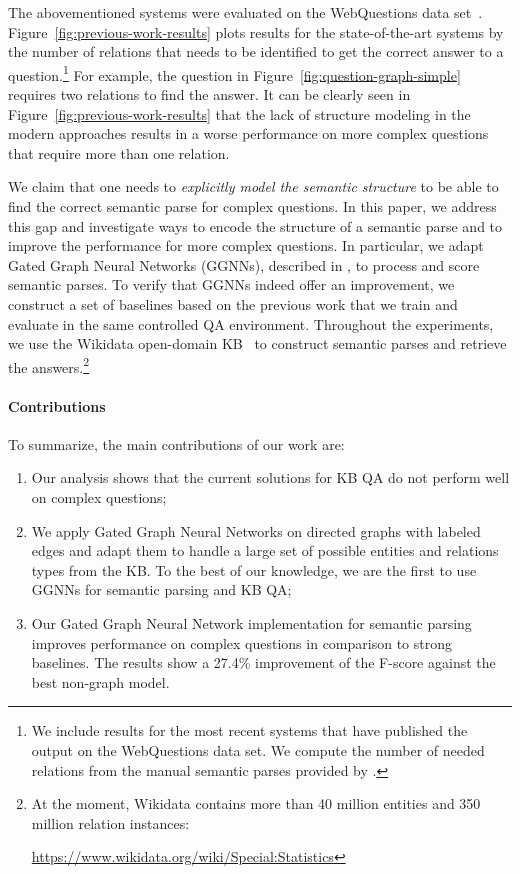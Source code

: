 \documentclass[11pt]{article}
\begin{document}
The abovementioned systems were evaluated on the WebQuestions data set~\cite{Berant2013}. Figure~\ref{fig:previous-work-results} plots results for the state-of-the-art systems by the number of relations that needs to be identified to get the correct answer to a question.\footnote{We include results for the most recent systems that have published the output on the WebQuestions data set. We compute the number of needed relations from the manual semantic parses provided by .} For example, the question in Figure~\ref{fig:question-graph-simple} requires two relations to find the answer. It can be clearly seen in Figure~\ref{fig:previous-work-results} that the lack of structure modeling in the modern approaches results in a worse performance on more complex questions that require more than one relation.

We claim that one needs to \textit{explicitly model the semantic structure} to be able to find the correct semantic parse for complex questions. In this paper, we address this gap and investigate ways to encode the structure of a semantic parse and to improve the performance for more complex questions. In particular, we adapt Gated Graph Neural Networks (GGNNs), described in , to process and score semantic parses. To verify that GGNNs indeed offer an improvement, we construct a set of baselines based on the previous work that we train and evaluate in the same controlled QA environment. Throughout the experiments, we use the Wikidata  open-domain KB~\cite{Vrandecic2014} to construct semantic parses and retrieve the answers.\footnote{ At the moment, Wikidata contains more than 40 million entities and 350 million relation instances: \\ \raggedright \url{https://www.wikidata.org/wiki/Special:Statistics}}

\paragraph{Contributions} To summarize, the main contributions of our work are:
  \begin{enumerate}[label=(\roman*)]
    \item Our analysis shows that the current solutions for KB QA do not perform well on complex questions;
    \item We apply Gated Graph Neural Networks on directed graphs with labeled edges and adapt them to handle a large set of possible entities and relations types from the KB. To the best of our knowledge, we are the first to use GGNNs for semantic parsing and KB QA;
    \item Our Gated Graph Neural Network implementation for semantic parsing improves performance on complex questions in comparison to strong baselines. The results show a 27.4\% improvement of the F-score against the best non-graph model.
  \end{enumerate}
\end{document}
